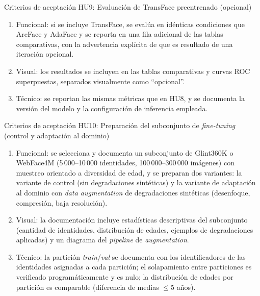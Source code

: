 \documentclass[
  11pt, %
]{charter}
\begin{document}
Criterios de aceptación HU9: Evaluación de TransFace preentrenado (opcional)
\begin{enumerate}
  \item Funcional: si se incluye TransFace, se evalúa en idénticas condiciones que ArcFace y AdaFace y se reporta en una fila adicional de las tablas comparativas, con la advertencia explícita de que es resultado de una iteración opcional.
  \item Visual: los resultados se incluyen en las tablas comparativas y curvas ROC superpuestas, separados visualmente como ``opcional''.
  \item Técnico: se reportan las mismas métricas que en HU8, y se documenta la versión del modelo y la configuración de inferencia empleada.
\end{enumerate}

Criterios de aceptación HU10: Preparación del subconjunto de \textit{fine-tuning} (control y adaptación al dominio)
\begin{enumerate}
  \item Funcional: se selecciona y documenta un subconjunto de Glint360K o WebFace4M (5\,000--10\,000 identidades, 100\,000--300\,000 imágenes) con muestreo orientado a diversidad de edad, y se preparan dos variantes: la variante de control (sin degradaciones sintéticas) y la variante de adaptación al dominio con \textit{data augmentation} de degradaciones sintéticas (desenfoque, compresión, baja resolución).
  \item Visual: la documentación incluye estadísticas descriptivas del subconjunto (cantidad de identidades, distribución de edades, ejemplos de degradaciones aplicadas) y un diagrama del \textit{pipeline} de \textit{augmentation}.
  \item Técnico: la partición \textit{train}/\textit{val} se documenta con los identificadores de las identidades asignadas a cada partición; el solapamiento entre particiones es verificado programáticamente y es nulo; la distribución de edades por partición es comparable (diferencia de medias $\leq 5$ años).
\end{enumerate}
\end{document}
